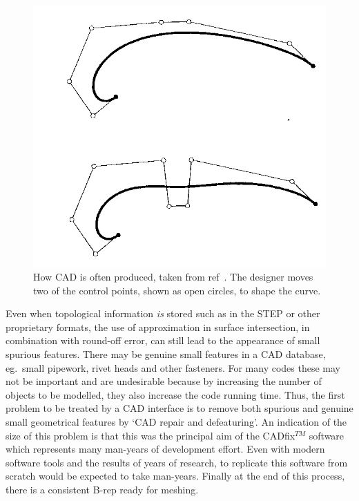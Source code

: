 \begin{figure}
\includegraphics[width=12cm]{../png/pullbezier}
\caption{How CAD is often produced, taken from ref~\cite{farin}.
 The designer moves two of the control points, shown
as open circles, to shape the curve.
\label{fig:pullbezier}}
\end{figure}

Even when topological
information \emph{is} stored such as in the STEP or other proprietary
formats, the use of approximation in surface intersection,
in combination with round-off error, can still lead to the appearance
of small spurious features.
There may be genuine small features in a CAD database, eg.\ small pipework,
rivet heads and other fasteners. For many codes these may not be important
and are undesirable
because by increasing the number of objects to be modelled, they also increase the
code running time. Thus, the first problem to be treated by a CAD interface
is to remove both spurious and genuine small geometrical
features by `CAD repair and defeaturing'. An indication of the size
of this problem is that this was the principal aim of the CADfix$^{TM}$ software
which represents many man-years of development effort. Even with modern
software tools and the results of years of research, to replicate this software
from scratch would be expected to take man-years. Finally at the end
of this process, there is a consistent B-rep ready for meshing.

